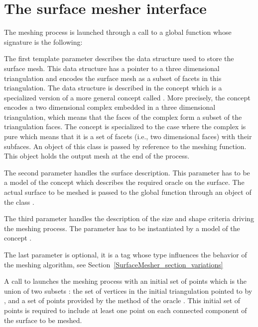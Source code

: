 \section{The surface mesher interface}
\label{SurfaceMesher_section_interface}

The meshing process is launched through a call to a global function
whose signature is the following:


The first template parameter  describes 
the data structure
used to store  the surface mesh. This data structure
has a pointer to a three dimensional triangulation and encodes
the surface mesh as a subset of facets in this triangulation.
The data structure is described in the concept
 which is a specialized version
of a more general concept called  .
More precisely, the concept 
encodes a two dimensional complex embedded  in a three dimensional
triangulation, which means that the faces of the complex form a subset
of the triangulation faces. The concept  is 
specialized to the case where the complex is pure which means that it
is a set of facets (i.e., two dimensional faces) with  their subfaces.
An object of this class is passed by reference to the meshing
function. This object holds the output mesh at the end of the
process.

The second parameter  handles the surface
description. This parameter  has to be a model of
the concept  which describes the
required oracle on the surface. The actual surface to be meshed is
passed  to the global function through an object of the class .

The third parameter handles the description of the size and shape
criteria driving the meshing process. The parameter 
has to be instantiated by a model of the concept .


The last parameter is optional, it is a tag 
whose type influences the behavior of the
meshing algorithm, see Section~\ref{SurfaceMesher_section_variations}

A call to 
 launches 
the meshing process with an initial 
set of points which is the union of two subsets :
the set of vertices in the  initial triangulation pointed to by ,
and a set of points provided by the  method 
of the oracle . This initial set of points is required 
to include at least one point on each connected component of the surface
to be meshed.


